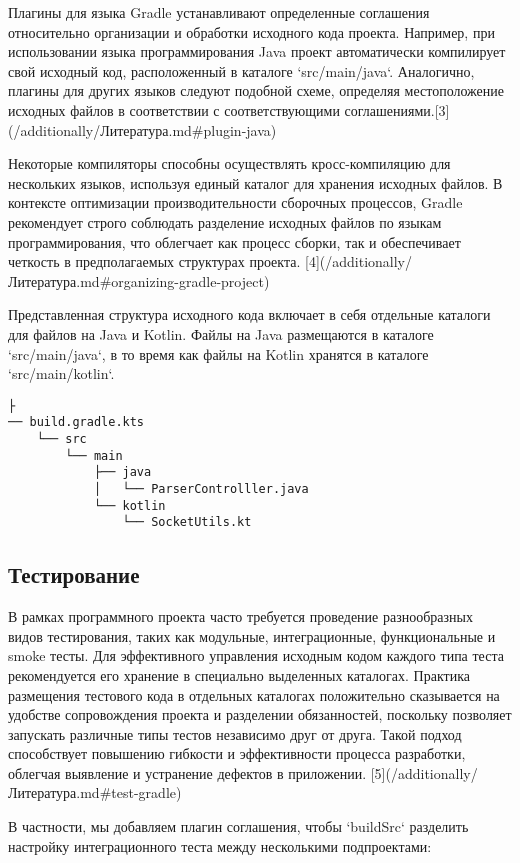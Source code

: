 Плагины для языка Gradle устанавливают определенные соглашения относительно организации и обработки
исходного кода проекта. Например, при использовании языка программирования Java проект автоматически
компилирует
свой исходный код, расположенный в каталоге `src/main/java`. Аналогично, плагины для других языков
следуют подобной схеме, определяя местоположение исходных файлов в соответствии с соответствующими
соглашениями.[3](/additionally/Литература.md\#plugin-java)

Некоторые компиляторы способны осуществлять кросс-компиляцию для нескольких языков, используя единый
каталог для хранения исходных файлов. В контексте оптимизации производительности сборочных
процессов, Gradle рекомендует строго соблюдать
разделение исходных файлов по языкам программирования, что облегчает как процесс сборки, так и
обеспечивает четкость в предполагаемых структурах
проекта. [4](/additionally/Литература.md\#organizing-gradle-project)

Представленная структура исходного кода включает в себя отдельные каталоги для файлов на Java и
Kotlin. Файлы на Java размещаются в каталоге `src/main/java`, в то время как файлы на Kotlin
хранятся
в каталоге `src/main/kotlin`.

\begin{lstlisting}├
── build.gradle.kts
    └── src
        └── main
            ├── java
            │   └── ParserControlller.java
            └── kotlin
                └── SocketUtils.kt
\end{lstlisting}

\subsection{Тестирование}

В рамках программного проекта часто требуется проведение разнообразных видов тестирования, таких как
модульные, интеграционные, функциональные и smoke тесты. Для эффективного управления исходным
кодом каждого типа теста рекомендуется его хранение в специально выделенных каталогах. Практика
размещения тестового кода в отдельных каталогах положительно сказывается на удобстве сопровождения
проекта и разделении обязанностей, поскольку позволяет запускать различные типы тестов независимо
друг от друга. Такой подход способствует повышению гибкости и эффективности процесса разработки,
облегчая выявление и устранение дефектов в приложении. [5](/additionally/Литература.md\#test-gradle)

В частности, мы добавляем плагин соглашения, чтобы `buildSrc` разделить настройку интеграционного
теста между несколькими подпроектами:

